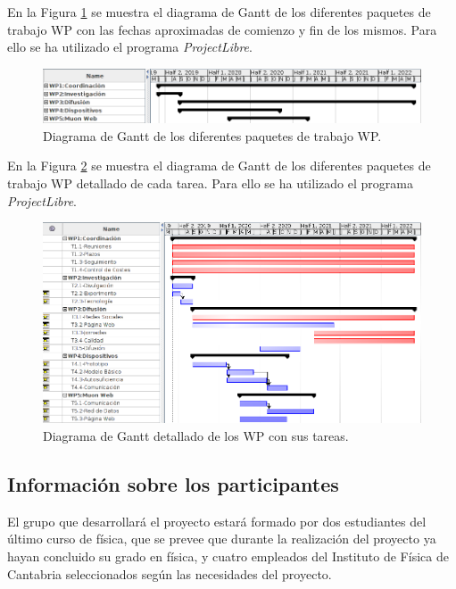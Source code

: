 \documentclass[11pt]{extarticle}
\begin{document}
				En la Figura \ref{Img:GanttWP} se muestra el diagrama de Gantt de los diferentes paquetes de trabajo WP con las fechas aproximadas de comienzo y fin de los mismos. Para ello se ha utilizado el programa \textit{ProjectLibre}.

					\begin{figure}[H]
						\centering
						\includegraphics[scale=0.5]{Fotos/GanttWP.png}
						\caption{\label{Img:GanttWP}Diagrama de Gantt de los diferentes paquetes de trabajo WP.}
					\end{figure}

				En la Figura \ref{Img:GanttAll} se muestra el diagrama de Gantt de los diferentes paquetes de trabajo WP detallado de cada tarea. Para ello se ha utilizado el programa \textit{ProjectLibre}.

					\newpage
					\begin{figure}[H]
						\centering
						\includegraphics[angle=90, scale=0.65]{Fotos/GanttAll.png}
						\caption{\label{Img:GanttAll}Diagrama de Gantt detallado de los WP con sus tareas.}
					\end{figure}
					\newpage

			\subsection{Información sobre los participantes}
				\label{SubSec:}

				El grupo que desarrollará el proyecto estará formado por dos estudiantes del último curso de física, que se prevee que durante la realización del proyecto ya hayan concluido su grado en física, y cuatro empleados del Instituto de Física de Cantabria seleccionados según las necesidades del proyecto.
\end{document}
